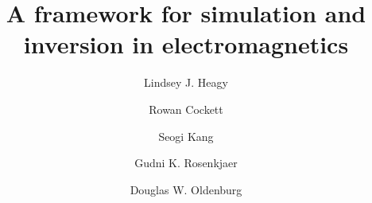 \documentclass[preprint,review,3p,times,onecolumn,authoryear]{elsarticle}
\begin{document}
\begin{frontmatter}



{%
\title{A framework for simulation and inversion in electromagnetics}

\author[corresponding,UBC]{Lindsey J. Heagy}
\author[UBC]{Rowan Cockett}
\author[UBC]{Seogi Kang}
\author[UBC]{Gudni K. Rosenkjaer}
\author[UBC]{Douglas W. Oldenburg}

\address[corresponding]{604-836-2715, lheagy@eos.ubc.ca}
\address[UBC]{Geophysical Inversion Facility, University of British Columbia}




\begin{abstract}


\end{abstract}}
\end{frontmatter}
\end{document}
